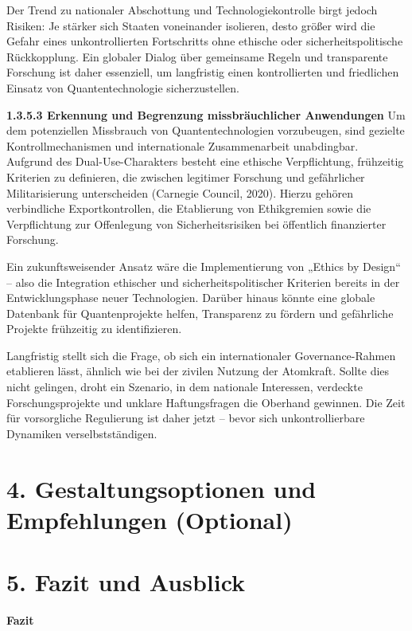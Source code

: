 Der Trend zu nationaler Abschottung und Technologiekontrolle birgt jedoch Risiken: Je stärker sich Staaten voneinander isolieren, desto größer wird die Gefahr eines unkontrollierten Fortschritts ohne ethische oder sicherheitspolitische Rückkopplung. Ein globaler Dialog über gemeinsame Regeln und transparente Forschung ist daher essenziell, um langfristig einen kontrollierten und friedlichen Einsatz von Quantentechnologie sicherzustellen.

 \textbf{1.3.5.3 Erkennung und Begrenzung missbräuchlicher Anwendungen }
 Um dem potenziellen Missbrauch von Quantentechnologien vorzubeugen, sind gezielte Kontrollmechanismen und internationale Zusammenarbeit unabdingbar. Aufgrund des Dual-Use-Charakters besteht eine ethische Verpflichtung, frühzeitig Kriterien zu definieren, die zwischen legitimer Forschung und gefährlicher Militarisierung unterscheiden (Carnegie Council, 2020). Hierzu gehören verbindliche Exportkontrollen, die Etablierung von Ethikgremien sowie die Verpflichtung zur Offenlegung von Sicherheitsrisiken bei öffentlich finanzierter Forschung.

Ein zukunftsweisender Ansatz wäre die Implementierung von „Ethics by Design“ – also die Integration ethischer und sicherheitspolitischer Kriterien bereits in der Entwicklungsphase neuer Technologien. Darüber hinaus könnte eine globale Datenbank für Quantenprojekte helfen, Transparenz zu fördern und gefährliche Projekte frühzeitig zu identifizieren.

Langfristig stellt sich die Frage, ob sich ein internationaler Governance-Rahmen etablieren lässt, ähnlich wie bei der zivilen Nutzung der Atomkraft. Sollte dies nicht gelingen, droht ein Szenario, in dem nationale Interessen, verdeckte Forschungsprojekte und unklare Haftungsfragen die Oberhand gewinnen. Die Zeit für vorsorgliche Regulierung ist daher jetzt – bevor sich unkontrollierbare Dynamiken verselbstständigen.

 


 

 
 

 

\section{4. Gestaltungsoptionen und Empfehlungen (Optional)}

\section{5. Fazit und Ausblick}
\textbf{Fazit}

